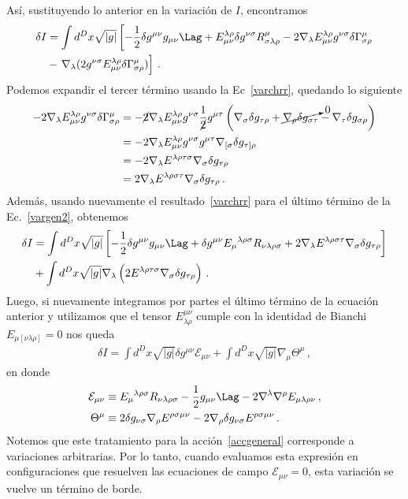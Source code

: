 \documentclass[../Main.tex]{subfiles}
\begin{document}
Así, sustituyendo lo anterior en la variación de $I$, encontramos 
\begin{align}\notag
    \delta I&=\int d^D x \sqrt{|g|}\left[-\frac{1}{2} \delta g^{\mu\nu}g_{\mu\nu} \Lag+E_{\mu\nu}^{\lambda\rho} \delta g^{\nu\sigma} R^{\mu}_{\sigma\lambda\rho}-2\nabla_{\lambda}E_{\mu\nu}^{\lambda\rho}g^{\nu\sigma}\delta\Gamma^{\mu}_{\sigma\rho}\right.\\
&-\left.\nabla_{\lambda}(2g^{\nu\sigma}E_{\mu \nu}^{\lambda \rho}\delta\Gamma^{\mu}_{\sigma\rho})\right]\, .\label{vargen2}
\end{align}
Podemos expandir el tercer término usando la Ec~\eqref{varchrr}, quedando lo siguiente
\begin{align}\notag
-2\nabla_{\lambda}E_{\mu\nu}^{\lambda\rho}g^{\nu\sigma}\delta\Gamma^{\mu}_{\sigma\rho}&=-\cancel{2}\nabla_{\lambda}E_{\mu\nu}^{\lambda\rho}g^{\nu\sigma}\frac{1}{\cancel{2}}g^{\mu\tau}\left(\nabla_{\sigma}\delta g_{\tau\rho}+\cancelto{0}{\nabla_{\rho}\delta g_{\sigma\tau}}-\nabla_{\tau}\delta g_{\sigma\rho}\right) \\ \notag
&=-2\nabla_{\lambda}E_{\mu\nu}^{\lambda\rho}g^{\nu\sigma}g^{\mu\tau}\nabla_{[\sigma}\delta g_{\tau]\rho} \\ \notag
&=-2\nabla_{\lambda}E^{\lambda\rho\tau\sigma}\nabla_{\sigma}\delta g_{\tau\rho}\\
&=2\nabla_{\lambda}E^{\lambda\rho\sigma\tau}\nabla_{\sigma}\delta g_{\tau\rho}\, .
\end{align}
Además, usando nuevamente el resultado~\eqref{varchrr} para el último término de la Ec.~\eqref{vargen2}, obtenemos
\begin{align}\notag
\delta I&=\int d^D x \sqrt{|g|}\left[-\frac{1}{2} \delta g^{\mu\nu}g_{\mu\nu}\Lag+\delta g^{\mu\nu} E_{\mu}{}^{\lambda\rho\sigma}R_{\nu\lambda\rho\sigma}+2 \nabla_{\lambda} E^{\lambda\rho\sigma\tau}\nabla_{\sigma} \delta g_{\tau\rho}\right]  \\
&+\int d^D x \sqrt{|g|} \nabla_{\lambda}\left(2 E^{\lambda\rho\tau\sigma}\nabla_{\sigma}\delta g_{\tau \rho}\right)\, . \label{vararbitraria}
\end{align}
Luego, si nuevamente integramos por partes el último término de la ecuación anterior y utilizamos que el tensor $E^{\mu\nu}_{\lambda\rho}$ cumple con la identidad de Bianchi $E_{\mu[\nu\lambda\rho]}=0$ nos queda
\begin{align}
\delta I=\int d^D x \sqrt{|g|} \delta g^{\mu\nu} \mathcal{E}_{\mu\nu}+\int d^D x \sqrt{|g|} \nabla_{\mu} \Theta^{\mu} \, ,
\end{align}
en donde
\begin{align}
\mathcal{E}_{\mu\nu} &\equiv E_{\mu}{}^{\lambda\rho\sigma} R_{\nu\lambda\rho\sigma}-\frac{1}{2} g_{\mu\nu}\Lag-2 \nabla^{\lambda}\nabla^{\rho}E_{\mu\lambda\rho\nu}\, ,\\
\Theta{^\mu} &\equiv 2 \delta g_{\nu\sigma}\nabla_\rho E^{\rho\sigma\mu\nu}-2\nabla_{\rho}\delta g_{\nu \sigma} E^{\rho\sigma\mu\nu}\, .
\end{align}
Notemos que este tratamiento para la acción~\eqref{accgeneral} corresponde a variaciones arbitrarias. Por lo tanto, cuando evaluamos esta expresión en configuraciones que resuelven las ecuaciones de campo $\mathcal{E}_{\mu\nu}=0$, esta variación se vuelve un término de borde. 
\end{document}
